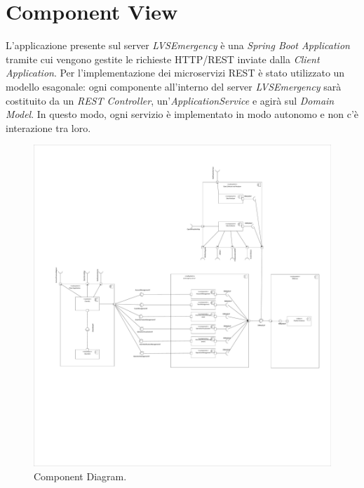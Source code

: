 \section{Component View}
L'applicazione presente sul server \textit{LVSEmergency} è una \textit{Spring Boot Application} tramite cui vengono gestite le richieste HTTP/REST inviate dalla \textit{Client Application}.
Per l'implementazione dei microservizi REST è stato utilizzato un modello esagonale: ogni componente all'interno del server \textit{LVSEmergency} sarà costituito da un \textit{REST Controller}, un'\textit{ApplicationService} e agirà sul \textit{Domain Model}. In questo modo, ogni servizio è implementato in modo autonomo e non c'è interazione tra loro.
\begin{figure}[h!]
	\centering
	\includegraphics[width=1\linewidth]{./Iterazione 1/OtherFiles/UML - Component View}
	\caption{Component Diagram.}
	\label{fig:ComponentDiagram}
\end{figure}